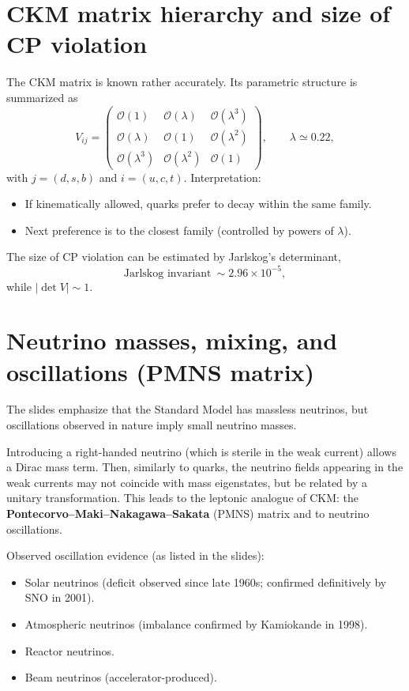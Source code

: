 \section{CKM matrix hierarchy and size of CP violation}
The CKM matrix is known rather accurately. Its parametric structure is summarized as
\begin{equation}
V_{ij}=
\begin{pmatrix}
\mathcal{O}(1) & \mathcal{O}(\lambda) & \mathcal{O}(\lambda^3)\\
\mathcal{O}(\lambda) & \mathcal{O}(1) & \mathcal{O}(\lambda^2)\\
\mathcal{O}(\lambda^3) & \mathcal{O}(\lambda^2) & \mathcal{O}(1)
\end{pmatrix},
\qquad
\lambda\simeq 0.22,
\end{equation}
with $j=(d,s,b)$ and $i=(u,c,t)$. Interpretation:
\begin{itemize}
  \item If kinematically allowed, quarks prefer to decay within the same family.
  \item Next preference is to the closest family (controlled by powers of $\lambda$).
\end{itemize}
The size of CP violation can be estimated by Jarlskog's determinant,
\begin{equation}
\boxed{\text{Jarlskog invariant}~\sim 2.96\times 10^{-5}},
\end{equation}
while $|\det V|\sim 1$.

\section{Neutrino masses, mixing, and oscillations (PMNS matrix)}
The slides emphasize that the Standard Model has massless neutrinos, but oscillations
observed in nature imply small neutrino masses.

Introducing a right-handed neutrino (which is sterile in the weak current) allows a Dirac mass term.
Then, similarly to quarks, the neutrino fields appearing in the weak currents may not coincide with mass eigenstates,
but be related by a unitary transformation. This leads to the leptonic analogue of CKM: the
\textbf{Pontecorvo--Maki--Nakagawa--Sakata} (PMNS) matrix and to neutrino oscillations.

Observed oscillation evidence (as listed in the slides):
\begin{itemize}
  \item Solar neutrinos (deficit observed since late 1960s; confirmed definitively by SNO in 2001).
  \item Atmospheric neutrinos (imbalance confirmed by Kamiokande in 1998).
  \item Reactor neutrinos.
  \item Beam neutrinos (accelerator-produced).
\end{itemize}

